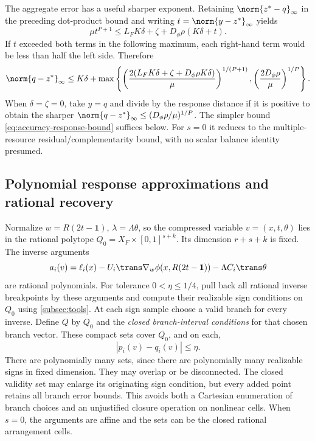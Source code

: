 The aggregate error has a useful sharper exponent. Retaining
$\norm{z^*-q}_\infty$ in the preceding dot-product bound and writing
$t=\norm{y-z^*}_\infty$ yields
\[
 \mu t^{P+1}\le L_FK\delta+\zeta+D_\phi\rho(K\delta+t).
\]
If $t$ exceeded both terms in the following maximum, each right-hand
term would be less than half the left side. Therefore
\begin{equation}\label{eq:accuracy-sharp-mismatch}
 \norm{q-z^*}_\infty\le K\delta+
 \max\left\{
 \left(\frac{2(L_FK\delta+\zeta+D_\phi\rho K\delta)}\mu\right)^{1/(P+1)},
 \left(\frac{2D_\phi\rho}\mu\right)^{1/P}\right\}.
\end{equation}
When $\delta=\zeta=0$, take $y=q$ and divide by the response distance
if it is positive to obtain the sharper
$\norm{q-z^*}_\infty\le(D_\phi\rho/\mu)^{1/P}$.
The simpler bound \eqref{eq:accuracy-response-bound} suffices below.
For $s=0$ it reduces to the multiple-resource residual/complementarity
bound, with no scalar balance identity presumed.

\subsection{Polynomial response approximations and rational recovery}
\label{subsec:accuracy-graph}

Normalize $w=R(2t-\mathbf1)$, $\lambda=\Lambda\theta$, so the
compressed variable $v=(x,t,\theta)$ lies in the rational polytope
$Q_0=X_F\times[0,1]^{s+k}$. Its dimension $r+s+k$ is fixed.
The inverse arguments
\[
 a_i(v)=\ell_i(x)-U_i\trans\nabla_w\phi(x,R(2t-\mathbf1))
                                           -\Lambda C_i\trans\theta
\]
are rational polynomials. For tolerance $0<\eta\le1/4$, pull back
all rational inverse breakpoints by these arguments and compute their
realizable sign conditions on $Q_0$ using \cref{subsec:tools}.
At each sign sample choose a valid branch for every inverse. Define
$Q$ by $Q_0$ and the \emph{closed branch-interval conditions} for that
chosen branch vector. These compact sets cover $Q_0$, and on each,
\begin{equation}\label{eq:accuracy-valid-branches}
                     |p_i(v)-q_i(v)|\le\eta.
\end{equation}
There are polynomially many sets, since there are polynomially many
realizable signs in fixed dimension. They may overlap or be disconnected.
The closed validity set may enlarge its originating sign condition,
but every added point retains all branch error bounds. This avoids
both a Cartesian enumeration of branch choices and an unjustified
closure operation on nonlinear cells. When $s=0$, the arguments are
affine and the sets can be the closed rational arrangement cells.

